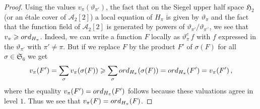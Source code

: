 \documentclass[10pt,a4paper]{amsart}
\def\geq{\geqslant}
\begin{document}
\begin{proof}
Using the values $v_{\pi}(\vartheta_{\pi'})$,
the fact that on the Siegel upper half space  $\mathfrak{H}_2$ (or an \'etale cover of
$\mathcal{A}_2[2]$) a local equation of $H_{\pi}$ is given by $\vartheta_{\pi}$ and
the fact that the function field of $\mathcal{A}_2[2]$ is generated by powers of
$\vartheta_{\pi'}/\vartheta_{\pi^{\prime\prime}}$, we see that
$v_{\pi}\geq {\rm ord}_{H_{\pi}}$. Indeed, we can write
a function $F$ locally as $\vartheta^c_{\pi}\, f$ with $f$ expressed in the $\vartheta_{\pi'}$ with $\pi'\neq \pi$.
But if we replace $F$ by the product $F'$ of $\sigma(F)$
for all $\sigma \in \mathfrak{S}_6$ we get
$$
v_{\pi}(F')=\sum_{\sigma} v_{\pi}(\sigma(F)) \geq 
\sum_{\sigma} {\rm ord}_{H_{\pi}}(\sigma(F))=
{\rm ord}_{H_{\pi}}(F')=v_{\pi}(F')\, ,
$$
where the equality $v_{\pi}(F')={\rm ord}_{H_{\pi}}(F')$ follows because these valuations agree in level $1$.
Thus we see that $v_{\pi}(F)={\rm ord}_{H_{\pi}}(F)$.

\end{proof}
\end{document}
